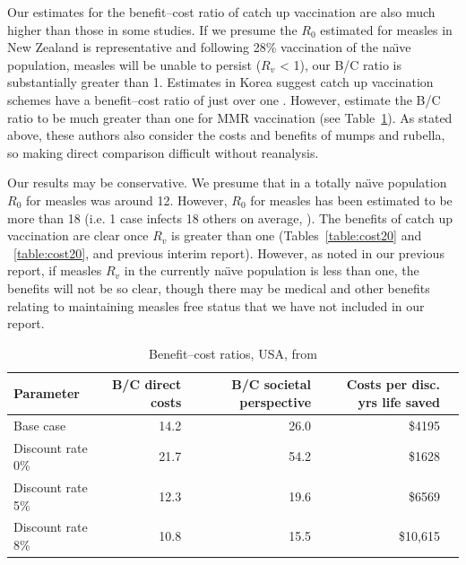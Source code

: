 \documentclass{article}
\begin{document}
\begin{itemize}
Our estimates for the benefit--cost ratio of catch up vaccination are also much higher than those in some studies. If we presume the $R_0$ estimated for measles in New Zealand is representative and following 28\% vaccination of the na\"{\i}ve population, measles will be unable to persist ($R_v$ < 1), our B/C ratio is substantially greater than 1. Estimates in Korea suggest catch up vaccination schemes have a benefit--cost ratio of just over one \citep{bae13}. However,  \citep{zhou4} estimate the B/C ratio to be much greater than one for MMR vaccination (see Table~\ref{table:zhou2}). As stated above, these authors also consider the costs and benefits of mumps and rubella, so making direct comparison difficult without reanalysis.

Our results may be conservative. We presume that in a totally na\"{\i}ve population $R_0$ for measles was around 12. However, $R_0$ for measles has been estimated to be more than 18 (i.e. 1 case infects 18 others on average, \citep{anderson91}). The benefits of catch up vaccination are clear once $R_v$ is greater than one (Tables~\ref{table:cost20} and ~\ref{table:cost20}, and previous interim report). However, as noted in our previous report, if measles $R_v$ in the currently na\"{\i}ve population is less than one, the benefits will not be so clear, though there may be medical and other benefits relating to maintaining measles free status that we have not included in our report.

\begin{table}[htdp]
\tiny
\begin{center}
\begin{tabular}{lrrrr}
\hline
Parameter & B/C direct costs & B/C societal
perspective & Costs per disc. yrs life saved\\
\hline
Base case & 14.2 & 26.0 & \$4195 \\
Discount rate 0\% & 21.7 & 54.2 & \$1628 \\
Discount rate 5\% & 12.3 & 19.6 & \$6569 \\
Discount rate 8\% & 10.8 & 15.5 & \$10,615 \\
\hline
\end{tabular}
\end{center}
\caption{Benefit--cost ratios, USA, from \citep{zhou4}}
\label{table:zhou2}
\end{table}%


\end{itemize}
\end{document}
